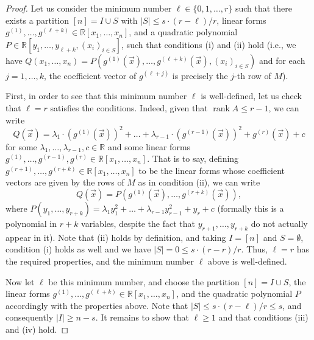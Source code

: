 \documentclass[english]{article}
\theoremstyle{remark}
\numberwithin{equation}{section}
\numberwithin{figure}{section}
\newcommand{\RR}{\mathbb{R}}
\begin{document}
\begin{proof}
Let us consider the minimum number $\ell\in\{0,1,\dots,r\}$ such that there exists a partition $[n]=I\cup S$ with $|S|\le s\cdot (r-\ell)/r$, linear forms $g^{(1)},\dots,g^{({\ell+k})} \in \mathbb{R}[x_1,\dots,x_n]$, and a quadratic polynomial $P\in \mathbb{R}[y_1,\dots,y_{\ell+k}, (x_i)_{i\in S}]$, such that conditions (i) and (ii) hold (i.e., we have $Q(x_1,\dots,x_n)=P(g^{(1)}(\vec{x}),\dots,g^{({\ell+k})}(\vec{x}), (x_i)_{i\in S})$ and for each $j=1,\dots,k$, the coefficient vector of $g^{({\ell+j})}$ is precisely the $j$-th row of $M$).

First, in order to see that this minimum number $\ell$ is well-defined, let us check that $\ell=r$ satisfies the conditions. Indeed, given that $\operatorname{rank} A\le r-1$,  we can write \[Q(\vec x)=\lambda_{1}\cdot (g^{({1})}(\vec{x}))^2+\dots+\lambda_{r-1} \cdot (g^{({r-1})}(\vec{x}))^2+g^{(r)}(\vec x)+c\] for some $\lambda_1,\dots,\lambda_{r-1},c\in \RR$ and some linear forms $g^{({1})},\dots,g^{({r-1})},g^{(r)} \in \mathbb{R}[x_1,\dots,x_n]$. That is to say, defining $g^{({r+1})},\dots,g^{({r+k})} \in \mathbb{R}[x_1,\dots,x_n]$ to be the linear forms whose coefficient vectors are given by the rows of $M$ as in condition (ii), we can write
\[Q(\vec x)=P(g^{(1)}(\vec{x}),\dots,g^{(r+k)}(\vec{x})),\]
where $P(y_1,\dots,y_{r+k})=\lambda_1 y_1^2+\dots+\lambda_{r-1} y_{r-1}^2+y_r+c$ (formally this is a polynomial in $r+k$ variables, despite the fact that $y_{r+1},\dots,y_{r+k}$ do not actually appear in it). Note that (ii) holds by definition, and taking $I=[n]$ and $S=\emptyset$, condition (i) holds as well and we have $|S|=0\le s\cdot (r-r)/r$. Thus, $\ell=r$ has the required properties, and the minimum number $\ell$ above is well-defined.

Now let $\ell$ be this minimum number, and choose the partition $[n]=I\cup S$, the linear forms $g^{(1)},\dots,g^{({\ell+k})} \in \mathbb{R}[x_1,\dots,x_n]$, and the quadratic polynomial $P$ accordingly with the properties above. Note that $|S|\le s\cdot (r-\ell)/r\le s$, and consequently $|I|\ge n-s$. It remains to show that $\ell\ge 1$ and that conditions (iii) and (iv) hold.


\end{proof}
\end{document}
